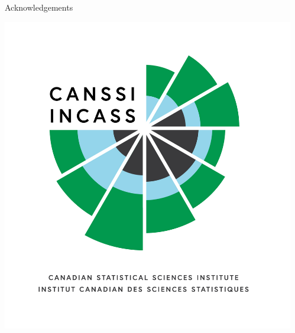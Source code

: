 \documentclass[final]{beamer}
\newlength{\sepwid}
\newlength{\onecolwid}
\begin{document}
\begin{frame}[t]
\begin{columns}[t]
\begin{column}{\onecolwid}
\begin{block}{Acknowledgements}
\begin{center}
		   \includegraphics[width=7in]{CANSSI_Logo-tag-stacked.jpg}
    			 \end{center}
    		  \end{block}
        \end{column}
      \begin{column}{\sepwid}\end{column}			%
     \end{columns}
\end{frame}
\end{document}

